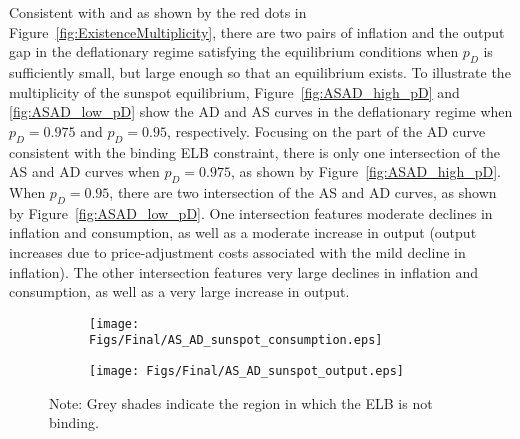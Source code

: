 \documentclass[11pt]{article}
\begin{document}
\begin{singlespace}
		Consistent with \citet{BonevaBraunWaki2016} and as shown by the red dots in Figure~\ref{fig:ExistenceMultiplicity}, there are two pairs of inflation and the output gap in the deflationary regime satisfying the equilibrium conditions when $p_{D}$ is sufficiently small, but large enough so that an equilibrium exists. To illustrate the multiplicity of the sunspot equilibrium, Figure~\ref{fig:ASAD_high_pD} and \ref{fig:ASAD_low_pD} show the AD and AS curves in the deflationary regime when $p_{D}=0.975$ and $p_{D}=0.95$, respectively. Focusing on the part of the AD curve consistent with the binding ELB constraint, there is only one intersection of the AS and AD curves when $p_{D}=0.975$, as shown by Figure~\ref{fig:ASAD_high_pD}. When $p_{D}=0.95$, there are two intersection of the AS and AD curves, as shown by Figure~\ref{fig:ASAD_low_pD}. One intersection features moderate declines in inflation and consumption, as well as a moderate increase in output (output increases due to price-adjustment costs associated with the mild decline in inflation). The other intersection features very large declines in inflation and consumption, as well as a very large increase in output.

		\begin{figure}[H]
			\caption{AD and AS Curves in the Deflationary Regime\\---High $p_D$---} \label{fig:ASAD_high_pD}
	        \vspace{-1em}
			\begin{center}
				\begin{subfigure}[b]{0.4\textwidth}
					\centering
					\texttt{[image: Figs/Final/AS\_AD\_sunspot\_consumption.eps]}
				\end{subfigure}
				\hspace{0.5cm}
				\begin{subfigure}[b]{0.4\textwidth}
					\centering
					\texttt{[image: Figs/Final/AS\_AD\_sunspot\_output.eps]}
				\end{subfigure}
			\end{center}
	        \vspace{-1em}
			{\footnotesize Note: Grey shades indicate the region in which the ELB is not binding.}
		\end{figure}


\end{singlespace}
\end{document}
